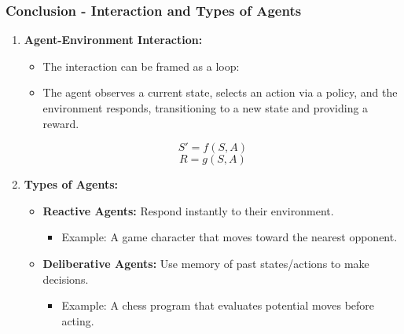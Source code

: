 \documentclass[aspectratio=169]{beamer}
\begin{document}
\begin{frame}[fragile]
  \frametitle{Conclusion - Interaction and Types of Agents}
  \begin{enumerate}[resume]
    \item \textbf{Agent-Environment Interaction:}
    \begin{itemize}
      \item The interaction can be framed as a loop:
      \item The agent observes a current state, selects an action via a policy, and the environment responds, transitioning to a new state and providing a reward.
      \end{itemize}
      \begin{equation}
        S' = f(S, A)
      \end{equation}
      \begin{equation}
        R = g(S, A)
      \end{equation}

    \item \textbf{Types of Agents:}
    \begin{itemize}
      \item \textbf{Reactive Agents:} Respond instantly to their environment.
      \begin{itemize}
        \item Example: A game character that moves toward the nearest opponent.
      \end{itemize}
      \item \textbf{Deliberative Agents:} Use memory of past states/actions to make decisions.
      \begin{itemize}
        \item Example: A chess program that evaluates potential moves before acting.
      \end{itemize}
    \end{itemize}
  \end{enumerate}
\end{frame}
\end{document}
